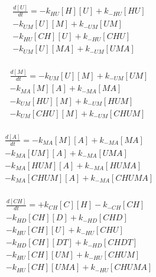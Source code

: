 \begin{equation}
\begin{split}
\frac{d[U]}{dt} =     - k_{HU}[H][U]    + k_{-HU}[HU]     \\%
                      - k_{UM}[U][M]    + k_{-UM}[UM]     \\%
                      - k_{HU}[CH][U]   + k_{-HU}[CHU]    \\%
                      - k_{UM}[U][MA]   + k_{-UM}[UMA]    \\%
\end{split}
\end{equation}

\begin{equation}
\begin{split}
\frac{d[M]}{dt} =     - k_{UM}[U][M]    + k_{-UM}[UM]     \\%
                      - k_{MA}[M][A]    + k_{-MA}[MA]     \\%
                      - k_{UM}[HU][M]   + k_{-UM}[HUM]    \\%
                      - k_{UM}[CHU][M]  + k_{-UM}[CHUM]   \\%
\end{split}
\end{equation}

\begin{equation}
\begin{split}
\frac{d[A]}{dt} =     - k_{MA}[M][A]    + k_{-MA}[MA]     \\%
                      - k_{MA}[UM][A]   + k_{-MA}[UMA]    \\%
                      - k_{MA}[HUM][A]  + k_{-MA}[HUMA]   \\%
                      - k_{MA}[CHUM][A] + k_{-MA}[CHUMA]  \\%
\end{split}
\end{equation}

\begin{equation}
\begin{split}
\frac{d[CH]}{dt} =    + k_{CH}[C][H]    - k_{-CH}[CH]     \\%
                      - k_{HD}[CH][D]   + k_{-HD}[CHD]    \\%
                      - k_{HU}[CH][U]   + k_{-HU}[CHU]    \\%
                      - k_{HD}[CH][DT]  + k_{-HD}[CHDT]   \\%
                      - k_{HU}[CH][UM]  + k_{-HU}[CHUM]   \\%
                      - k_{HU}[CH][UMA] + k_{-HU}[CHUMA]  \\%
\end{split}
\end{equation}

